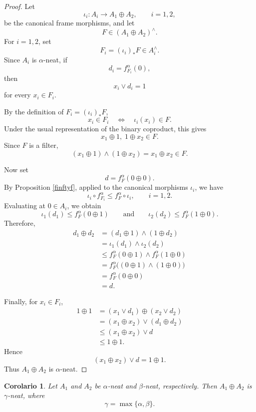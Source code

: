 \documentclass[11pt]{amsart}
\theoremstyle{plain}
\newtheorem{cor}[thm]{Corolario}
\theoremstyle{definition}
\begin{document}
\begin{proof}
Let
\[
    \iota_i\colon A_i\longrightarrow A_1\oplus A_2,
    \qquad i=1,2,
\]
be the canonical frame morphisms, and let
\[
    F\in (A_1\oplus A_2)^\wedge.
\]
For \(i=1,2\), set
\[
    F_i=(\iota_i)_*F\in A_i^\wedge.
\]
Since \(A_i\) is \(\alpha\)-neat, if
\[
    d_i=f_{F_i}^{\alpha}(0),
\]
then
\[
    x_i\vee d_i=1
\]
for every \(x_i\in F_i\).

By the definition of \(F_i=(\iota_i)_*F\),
\[
    x_i\in F_i
    \quad\Longleftrightarrow\quad
    \iota_i(x_i)\in F.
\]
Under the usual representation of the binary coproduct, this gives
\[
    x_1\oplus 1,\;1\oplus x_2\in F.
\]
Since \(F\) is a filter,
\[
    (x_1\oplus 1)\wedge(1\oplus x_2)
    =x_1\oplus x_2\in F.
\]

Now set
\[
    d=f_F^\alpha(0\oplus0).
\]
By Proposition \ref{finftyf}, applied to the canonical morphisms
\(\iota_i\), we have
\[
    \iota_i\circ f_{F_i}^\alpha
    \leq
    f_F^\alpha\circ\iota_i,
    \qquad i=1,2.
\]
Evaluating at \(0\in A_i\), we obtain
\[
    \iota_1(d_1)
    \leq f_F^\alpha(0\oplus1)
    \qquad\text{and}\qquad
    \iota_2(d_2)
    \leq f_F^\alpha(1\oplus0).
\]
Therefore,
\[
\begin{aligned}
    d_1\oplus d_2
    &=(d_1\oplus1)\wedge(1\oplus d_2)\\
    &=\iota_1(d_1)\wedge\iota_2(d_2)\\
    &\leq
    f_F^\alpha(0\oplus1)
    \wedge
    f_F^\alpha(1\oplus0)\\
    &=f_F^\alpha\bigl((0\oplus1)\wedge(1\oplus0)\bigr)\\
    &=f_F^\alpha(0\oplus0)\\
    &=d.
\end{aligned}
\]

Finally, for \(x_i\in F_i\),
\[
\begin{aligned}
    1\oplus1
    &=(x_1\vee d_1)\oplus(x_2\vee d_2)\\
    &=(x_1\oplus x_2)\vee(d_1\oplus d_2)\\
    &\leq(x_1\oplus x_2)\vee d\\
    &\leq1\oplus1.
\end{aligned}
\]
Hence
\[
    (x_1\oplus x_2)\vee d=1\oplus1.
\]
Thus \(A_1\oplus A_2\) is \(\alpha\)-neat.
\end{proof}

\begin{cor}\label{Paso 3}
Let $A_1$ and $A_2$ be $\alpha$-neat and $\beta$-neat, respectively. Then $A_1\oplus A_2$ is $\gamma$-neat, where
\[
\gamma=\max\{\alpha, \beta\}.
\]
\end{cor}
\end{document}
